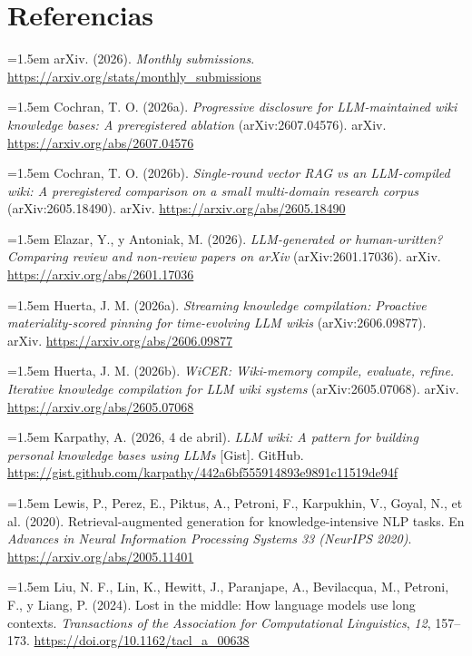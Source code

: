 \documentclass[11pt,letterpaper]{article}
\newcommand{\refhang}[1]{\par\noindent\hangindent=1.5em\hangafter=1 #1\par}
\begin{document}
\section*{Referencias}

\footnotesize\sloppy

\refhang{arXiv. (2026). \textit{Monthly submissions}. \url{https://arxiv.org/stats/monthly_submissions}}

\refhang{Cochran, T. O. (2026a). \textit{Progressive disclosure for LLM-maintained wiki knowledge bases: A preregistered ablation} (arXiv:2607.04576). arXiv. \url{https://arxiv.org/abs/2607.04576}}

\refhang{Cochran, T. O. (2026b). \textit{Single-round vector RAG vs an LLM-compiled wiki: A preregistered comparison on a small multi-domain research corpus} (arXiv:2605.18490). arXiv. \url{https://arxiv.org/abs/2605.18490}}

\refhang{Elazar, Y., y Antoniak, M. (2026). \textit{LLM-generated or human-written? Comparing review and non-review papers on arXiv} (arXiv:2601.17036). arXiv. \url{https://arxiv.org/abs/2601.17036}}

\refhang{Huerta, J. M. (2026a). \textit{Streaming knowledge compilation: Proactive materiality-scored pinning for time-evolving LLM wikis} (arXiv:2606.09877). arXiv. \url{https://arxiv.org/abs/2606.09877}}

\refhang{Huerta, J. M. (2026b). \textit{WiCER: Wiki-memory compile, evaluate, refine. Iterative knowledge compilation for LLM wiki systems} (arXiv:2605.07068). arXiv. \url{https://arxiv.org/abs/2605.07068}}

\refhang{Karpathy, A. (2026, 4 de abril). \textit{LLM wiki: A pattern for building personal knowledge bases using LLMs} [Gist]. GitHub. \url{https://gist.github.com/karpathy/442a6bf555914893e9891c11519de94f}}

\refhang{Lewis, P., Perez, E., Piktus, A., Petroni, F., Karpukhin, V., Goyal, N., et al. (2020). Retrieval-augmented generation for knowledge-intensive NLP tasks. En \textit{Advances in Neural Information Processing Systems 33 (NeurIPS 2020)}. \url{https://arxiv.org/abs/2005.11401}}

\refhang{Liu, N. F., Lin, K., Hewitt, J., Paranjape, A., Bevilacqua, M., Petroni, F., y Liang, P. (2024). Lost in the middle: How language models use long contexts. \textit{Transactions of the Association for Computational Linguistics}, \textit{12}, 157--173. \url{https://doi.org/10.1162/tacl_a_00638}}
\end{document}
